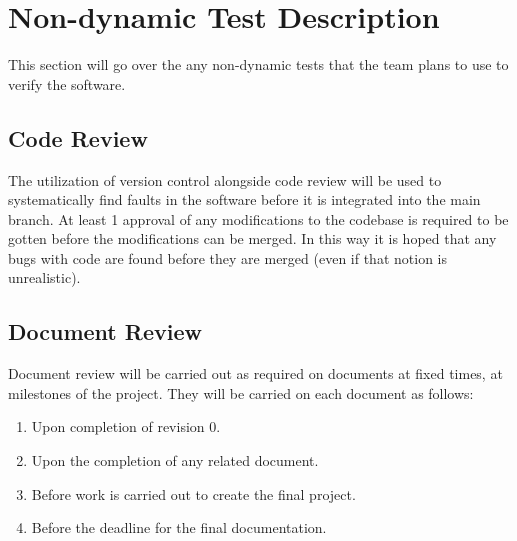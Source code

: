 \documentclass[12pt, titlepage]{article}
\begin{document}
\begin{table}[H]
  \centering
  \caption{Traceability Table for Non-Functional Test Cases and Requirements}
  \label{tab:NFRTrace}
\end{table}

\section{Non-dynamic Test Description}

This section will go over the any non-dynamic tests that the team plans to use to verify the software.

\subsection{Code Review}

The utilization of version control alongside code review will be used to systematically find faults in the software before it is integrated into the main branch. At least 1 approval of any modifications to the codebase is required to be gotten before the modifications can be merged. In this way it is hoped that any bugs with code are found before they are merged (even if that notion is unrealistic).

\subsection{Document Review}

Document review will be carried out as required on documents at fixed times, at milestones of the project. They will be carried on each document as follows:

\begin{enumerate}
    \item Upon completion of revision 0.
    \item Upon the completion of any related document.
    \item Before work is carried out to create the final project.
    \item Before the deadline for the final documentation.
\end{enumerate}
\end{document}
